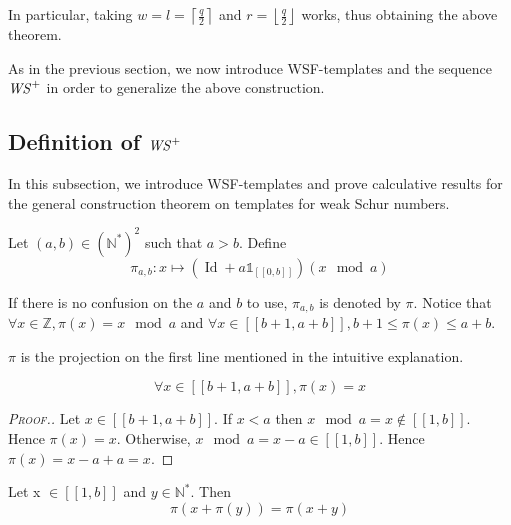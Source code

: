 In particular, taking \(w = l = \left\lceil \displaystyle \frac{q}{2} \right\rceil\) and \(r = \left\lfloor \displaystyle \frac{q}{2} \right\rfloor\) works, thus obtaining the above theorem.\\
\par
As in the previous section, we now introduce WSF-templates and the sequence \(\mathit{WS}^+\) in order to generalize the above construction.

\subsection{Definition of \(\mathit{WS}^+\)}

\qquad In this subsection, we introduce WSF-templates and prove calculative results for the general construction 
theorem on templates for weak Schur numbers.

\begin{definition}
Let \((a,b) \in (\mathbb{N}^*)^2\) such that \(a>b\). Define
\[ \pi_{a,b}:x \longmapsto (\operatorname{Id}+a\mathds{1}_{ [\![0,b]\!]})(x \mod a)\]
\end{definition}

If there is no confusion on the \(a\) and \(b\) to use, \(\pi_{a, b}\) is denoted by \(\pi\). Notice that 
\({\forall x \in \mathbb{Z}, \pi(x) = x \mod a}\) and \({\forall x \in [\![b + 1, a + b]\!], b + 1 \leqslant \pi(x) \leqslant a + b}\).

\begin{sloppypar}
\(\pi\) is the projection on the first line mentioned in the intuitive explanation. 
\end{sloppypar}

\begin{proposition}
\label{prop1}
\[
\forall x \in [\![b + 1, a + b]\!], \pi(x) = x
\]
\end{proposition}

\begin{proof}[\textsc{Proof.}]
\begin{sloppypar}
Let \(x \in [\![b + 1, a + b]\!]\). If \(x < a\) then \(x \mod a = x \notin [\![1, b]\!]\). Hence \(\pi(x) = x\). 
Otherwise, \({x \mod a = x - a \in [\![1, b]\!]}\). Hence \({\pi(x) = x - a + a = x}\).
\end{sloppypar}
\end{proof}

\begin{proposition}
\label{prop2}
Let x \(\in [\![1,b]\!]\) and \(y \in \mathbb{N}^*\). Then 
\[
\pi(x+\pi(y)) = \pi(x+y)
\]
\end{proposition}

